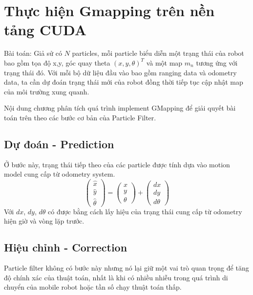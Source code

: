 \documentclass[../../main.tex]{subfiles}
\begin{document}
\graphicspath{{img/}{05_software/img/}}

\chapter{Thực hiện Gmapping trên nền tảng CUDA}


Bài toán: Giả sử có $N$ particles, mỗi particle biểu diễn một trạng thái của robot bao gồm tọa độ x,y, góc quay theta $(x, y, \theta)^T$ và một map $m_n$ tương ứng với trạng thái đó. Với mỗi bộ dữ liệu đầu vào bao gồm ranging data và odometry data, ta cần dự đoán trạng thái mới của robot đồng thời tiếp tục cập nhật map của môi trường xung quanh.

Nội dung chương phân tích quá trình implement GMapping để giải quyết bài toán trên theo các bước cơ bản của Particle Filter.

\section{Dự đoán - Prediction}
Ở bước này, trạng thái tiếp theo của các particle được tính dựa vào motion model cung cấp từ odometry system. 
\begin{equation}
    \begin{pmatrix}
        \hat{x} \\ \hat{y} \\ \hat{\theta}
    \end{pmatrix}
    = 
    \begin{pmatrix}
        x \\ y \\ \theta
    \end{pmatrix}
    + 
    \begin{pmatrix}
        dx \\ dy \\ d\theta
    \end{pmatrix}
\end{equation}
Với $dx$, $dy$, $d\theta$ có được bằng cách lấy hiệu của trạng thái cung cấp từ odometry hiện giờ và vòng lặp trước.

\section{Hiệu chỉnh - Correction}
Particle filter không có bước này nhưng nó lại giữ một vai trò quan trọng để tăng độ chính xác của thuật toán, nhất là khi có nhiều nhiễu trong quá trình di chuyển của mobile robot hoặc tần số  chạy thuật toán thấp.
\end{document}
